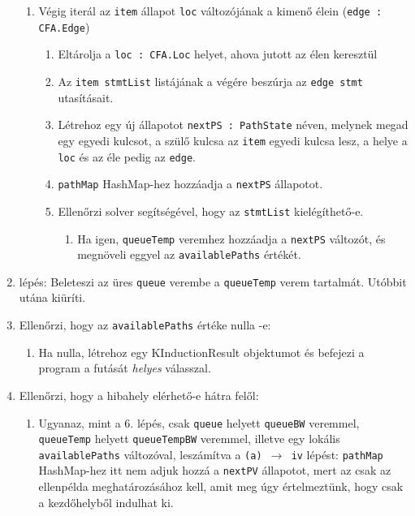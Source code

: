 \begin{enumerate}
	\begin{enumerate}
		\item Végig iterál az \texttt{item} állapot \texttt{loc} változójának a kimenő élein (\texttt{edge : CFA.Edge})
		\begin{enumerate}
			\item Eltárolja a \texttt{loc : CFA.Loc} helyet, ahova jutott az élen keresztül
			\item Az \texttt{item stmtList} listájának a végére beszúrja az \texttt{edge stmt} utasításait.
			\item Létrehoz egy új állapotot \texttt{nextPS : PathState} néven, melynek megad egy egyedi kulcsot, a szülő kulcsa az \texttt{item} egyedi kulcsa lesz, a helye a \texttt{loc} és az éle pedig az \texttt{edge}.
			\item \texttt{pathMap} HashMap-hez hozzáadja a \texttt{nextPS} állapotot.
			\item Ellenőrzi solver segítségével, hogy az \texttt{stmtList} kielégíthető-e.
			\begin{enumerate}
				\item Ha igen, \texttt{queueTemp} veremhez hozzáadja a \texttt{nextPS} változót, és megnöveli eggyel az \texttt{availablePaths} értékét.
			\end{enumerate}
		\end{enumerate}
	\end{enumerate}
	\item lépés: Beleteszi az üres \texttt{queue} verembe a \texttt{queueTemp} verem tartalmát. Utóbbit utána kiüríti.
	\item Ellenőrzi, hogy az \texttt{availablePaths} értéke nulla -e:
	\begin{enumerate}
		\item Ha nulla, létrehoz egy KInductionResult objektumot és befejezi a program a futását \textit{helyes} válasszal.
	\end{enumerate}
	\item Ellenőrzi, hogy a hibahely elérhető-e hátra felől:
	\begin{enumerate}
		\item Ugyanaz, mint a 6. lépés, csak \texttt{queue} helyett \texttt{queueBW} veremmel, \texttt{queueTemp} helyett \texttt{queueTempBW} veremmel, illetve egy lokális \texttt{availablePaths} változóval, leszámítva a \texttt{(a) $ \rightarrow $ iv} lépést: \texttt{pathMap} HashMap-hez itt nem adjuk hozzá a \texttt{nextPV} állapotot, mert az csak az ellenpélda meghatározásához kell, amit meg úgy értelmeztünk, hogy csak a kezdőhelyből indulhat ki.

\end{enumerate}
\end{enumerate}
